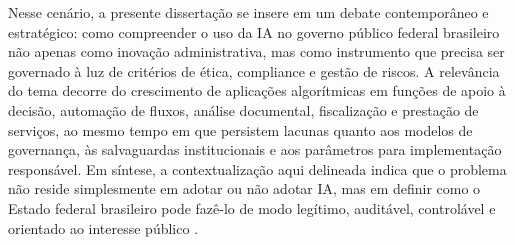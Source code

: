 \documentclass[12pt,a4paper]{article}
\begin{document}
Nesse cenário, a presente dissertação se insere em um debate contemporâneo e estratégico: como compreender o uso da IA no governo público federal brasileiro não apenas como inovação administrativa, mas como instrumento que precisa ser governado à luz de critérios de ética, compliance e gestão de riscos. A relevância do tema decorre do crescimento de aplicações algorítmicas em funções de apoio à decisão, automação de fluxos, análise documental, fiscalização e prestação de serviços, ao mesmo tempo em que persistem lacunas quanto aos modelos de governança, às salvaguardas institucionais e aos parâmetros para implementação responsável. Em síntese, a contextualização aqui delineada indica que o problema não reside simplesmente em adotar ou não adotar IA, mas em definir como o Estado federal brasileiro pode fazê-lo de modo legítimo, auditável, controlável e orientado ao interesse público \autocite{madan2022ai} \autocite{criado2024artificial} \autocite{serra2024a}.
\end{document}
